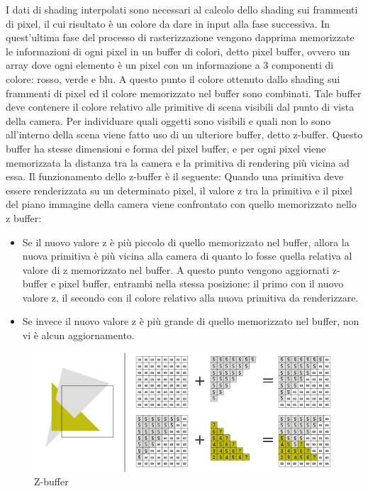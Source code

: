 I dati di shading interpolati sono necessari al calcolo dello shading sui frammenti di pixel, il cui risultato è un colore da dare in input alla fase successiva.
In quest’ultima fase del processo di rasterizzazione vengono dapprima memorizzate le informazioni di ogni pixel in un buffer di colori, detto pixel buffer, ovvero un array dove ogni elemento è un pixel con un informazione a 3 componenti di colore: rosso, verde e blu.
A questo punto il colore ottenuto dallo shading sui frammenti di pixel ed il colore memorizzato nel buffer sono combinati.
Tale buffer deve contenere il colore relativo alle primitive di scena visibili dal punto di vista della camera. 
Per individuare quali oggetti sono visibili e quali non lo sono all’interno della scena viene fatto uso di un ulteriore buffer, detto z-buffer. Questo buffer ha stesse dimensioni e forma del pixel buffer, e per ogni pixel viene memorizzata la distanza tra la camera e la primitiva di rendering più vicina ad essa. Il funzionamento dello z-buffer è il seguente: 
Quando una primitiva deve essere renderizzata su un determinato pixel, il valore z tra la primitiva e il pixel del piano immagine della camera viene confrontato con quello memorizzato nello z buffer:

\begin{itemize}
\item Se il nuovo valore z è più piccolo di quello memorizzato nel buffer, allora la nuova primitiva è più vicina alla camera di quanto lo fosse quella relativa al valore di z memorizzato nel buffer. A questo punto vengono aggiornati z-buffer e pixel buffer, entrambi nella stessa posizione: il primo con il nuovo valore z, il secondo con il colore relativo alla nuova primitiva da renderizzare. 
\item Se invece il nuovo valore z è più grande di quello memorizzato nel buffer, non vi è alcun aggiornamento.
\end{itemize}

\begin{figure}[htb]
 \centering
 \includegraphics[width=1.0\linewidth]{images/chapter_stato_arte/stato_arte_z_buffer.png}\hfill
 \caption[Z-buffer]{Z-buffer}
 \label{fig:stato_arte_z_buffer}
\end{figure}
